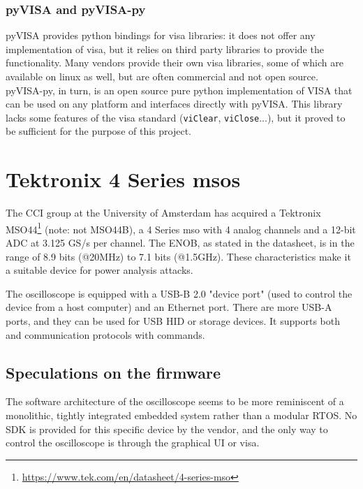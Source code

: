 \documentclass[a4paper,english,twoside,10pt]{article}
\begin{document}
\subsubsection{pyVISA and pyVISA-py}
pyVISA provides python bindings for \gls{visa} libraries: it does not offer any implementation of \gls{visa}, but it relies on third party libraries to provide the functionality. Many vendors provide their own \gls{visa} libraries, some of which are available on linux as well, but are often commercial and not open source. pyVISA-py, in turn, is an open source pure python implementation of VISA that can be used on any platform and interfaces directly with pyVISA. This library lacks some features of the \gls{visa} standard (\texttt{viClear}, \texttt{viClose}...), but it proved to be sufficient for the purpose of this project.

\section{Tektronix 4 Series \texorpdfstring{\glspl{mso}}{MSO}}
The CCI group at the University of Amsterdam has acquired a Tektronix MSO44\footnote{\url{https://www.tek.com/en/datasheet/4-series-mso}} (note: not MSO44B), a 4 Series \gls{mso} with 4 analog channels and a 12-bit ADC at 3.125 GS/s per channel. The ENOB, as stated in the datasheet, is in the range of 8.9 bits (@20MHz) to 7.1 bits (@1.5GHz). These characteristics make it a suitable device for power analysis attacks.

The oscilloscope is equipped with a USB-B 2.0 "device port" (used to control the device from a host computer) and an Ethernet port. There are more USB-A ports, and they can be used for USB HID or storage devices. It supports both  and  communication protocols with  commands.

\subsection{Speculations on the firmware}\label{sec:fw-info}
The software architecture of the oscilloscope seems to be more reminiscent of a monolithic, tightly integrated embedded system rather than a modular RTOS. No SDK is provided for this specific device by the vendor, and the only way to control the oscilloscope is through the graphical UI or \gls{visa}.
\end{document}
